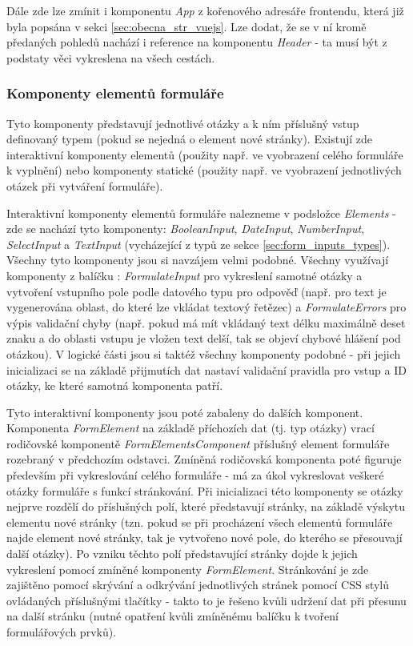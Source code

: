 		Dále zde lze zmínit i komponentu \textit{App} z kořenového adresáře frontendu, která již byla popsána v sekci \ref{sec:obecna_str_vuejs}. Lze dodat, že se v ní kromě předaných pohledů nachází i reference na komponentu \textit{Header} - ta musí být z podstaty věci vykreslena na všech cestách.
		
		\subsubsection{Komponenty elementů formuláře} %
		Tyto komponenty představují jednotlivé otázky a k ním příslušný vstup definovaný typem (pokud se nejedná o element nové stránky). Existují zde interaktivní komponenty elementů (použity např. ve vyobrazení celého formuláře k vyplnění) nebo komponenty statické (použity např. ve vyobrazení jednotlivých otázek při vytváření formuláře).
		
		Interaktivní komponenty elementů formuláře nalezneme v podsložce \textit{Elements} - zde se nachází tyto komponenty: \textit{BooleanInput}, \textit{DateInput}, \textit{NumberInput}, \textit{SelectInput} a \textit{TextInput} (vycházející z typů ze sekce \ref{sec:form_inputs_types}). Všechny tyto komponenty jsou si navzájem velmi podobné. Všechny využívají komponenty z balíčku : \textit{FormulateInput} pro vykreslení samotné otázky a vytvoření vstupního pole podle datového typu pro odpověď (např. pro text je vygenerována oblast, do které lze vkládat textový řetězec) a \textit{FormulateErrors} pro výpis validační chyby (např. pokud má mít vkládaný text délku maximálně deset znaku a do oblasti vstupu je vložen text delší, tak se objeví chybové hlášení pod otázkou). V logické části jsou si taktéž všechny komponenty podobné - při jejich inicializaci se na základě přijmutích dat nastaví validační pravidla pro vstup a ID otázky, ke které samotná komponenta patří.
		
		Tyto interaktivní komponenty jsou poté zabaleny do dalších komponent. Komponenta \textit{FormElement} na základě příchozích dat (tj. typ otázky) vrací rodičovské komponentě \textit{FormElementsComponent} příslušný element formuláře rozebraný v předchozím odstavci. Zmíněná rodičovská komponenta poté figuruje především při vykreslování celého formuláře - má za úkol vykreslovat veškeré otázky formuláře s funkcí stránkování. Při inicializaci této komponenty se otázky nejprve rozdělí do příslušných polí, které představují stránky, na základě výskytu elementu nové stránky (tzn. pokud se při procházení všech elementů formuláře najde element nové stránky, tak je vytvořeno nové pole, do kterého se přesouvají další otázky). Po vzniku těchto polí představující stránky dojde k jejich vykreslení pomocí zmíněné komponenty \textit{FormElement}. Stránkování je zde zajištěno pomocí skrývání a odkrývání jednotlivých stránek pomocí CSS stylů ovládaných příslušnými tlačítky - takto to je řešeno kvůli udržení dat při přesunu na další stránku (nutné opatření kvůli zmíněnému balíčku k tvoření formulářových prvků).
		
